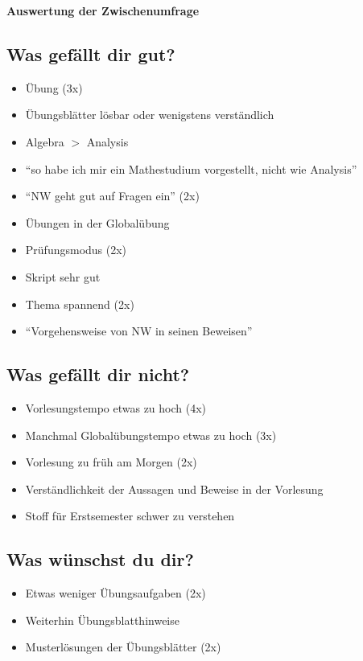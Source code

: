 \documentclass[16pt,a4paper,ngerman]{scrartcl}
\begin{document}
\begin{center}\Large\sffamily\textbf{Auswertung der Zwischenumfrage}\end{center}

\subsection*{Was gefällt dir gut?}

\begin{itemize}
  \item Übung (3x)
  \item Übungsblätter lösbar oder wenigstens verständlich
  \item Algebra $>$ Analysis
  \item "`so habe ich mir ein Mathestudium vorgestellt, nicht wie Analysis"'
  \item "`NW geht gut auf Fragen ein"' (2x)
  \item Übungen in der Globalübung
  \item Prüfungsmodus (2x)
  \item Skript sehr gut
  \item Thema spannend (2x)
  \item "`Vorgehensweise von NW in seinen Beweisen"'
\end{itemize}

\subsection*{Was gefällt dir nicht?}

\begin{itemize}
  \item Vorlesungstempo etwas zu hoch (4x)
  \item Manchmal Globalübungstempo etwas zu hoch (3x)
  \item Vorlesung zu früh am Morgen (2x)
  \item Verständlichkeit der Aussagen und Beweise in der Vorlesung
  \item Stoff für Erstsemester schwer zu verstehen
\end{itemize}

\subsection*{Was wünschst du dir?}

\begin{itemize}
  \item Etwas weniger Übungsaufgaben (2x)
  \item Weiterhin Übungsblatthinweise
  \item Musterlösungen der Übungsblätter (2x)
\end{itemize}
\end{document}
